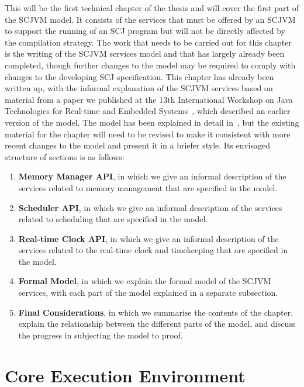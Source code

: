 \documentclass[a4paper,10pt]{report}
\let\olditem\item
\renewcommand{\item}[1][]{\olditem{\bfseries #1}}
\begin{document}
This will be the first technical chapter of the thesis and will cover
the first part of the SCJVM model.
It consists of the services that must be offered by an SCJVM to
support the running of an SCJ program but will not be directly
affected by the compilation strategy.
The work that needs to be carried out for this chapter is the writing
of the SCJVM services model and that has largely already been
completed, though further changes to the model may be required to
comply with changes to the developing SCJ specification.
This chapter has already been written up, with the informal
explanation of the SCJVM services based on material from a paper we
published at the 13th International Workshop on Java Technologies for
Real-time and Embedded Systems~\cite{baxter2015a}, which described an
earlier version of the model.
The model has been explained in detail in~\cite{baxter2016}, but the
existing material for the chapter will need to be revised to make it
consistent with more recent changes to the model and present it in a
briefer style.
Its envisaged structure of sections is as follows:
\begin{enumerate}
\item[Memory Manager API], in which we give an informal description of
  the services related to memory management that are specified in the
  model.
\item[Scheduler API], in which we give an informal description of the
  services related to scheduling that are specified in the model.
\item[Real-time Clock API], in which we give an informal description
  of the services related to the real-time clock and timekeeping that
  are specified in the model.
\item[Formal Model], in which we explain the formal model of the SCJVM
  services, with each part of the model explained in a separate
  subsection.
\item[Final Considerations], in which we summarise the contents of the
  chapter, explain the relationship between the different parts of the
  model, and discuss the progress in subjecting the model to proof.
\end{enumerate} 

\section{Core Execution Environment}
\end{document}

